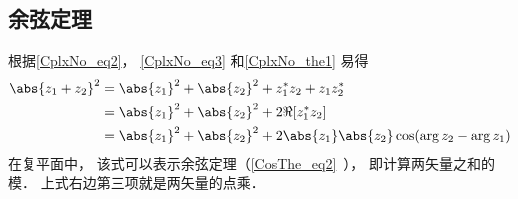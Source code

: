 \subsection{余弦定理}
根据\autoref{CplxNo_eq2}， \autoref{CplxNo_eq3} 和\autoref{CplxNo_the1} 易得
\begin{equation}
\begin{aligned}
\abs{z_1 + z_2}^2 &= \abs{z_1}^2 + \abs{z_2}^2 + z_1^* z_2 + z_1 z_2^*\\
&= \abs{z_1}^2 + \abs{z_2}^2 + 2\Re[z_1^* z_2]\\
&= \abs{z_1}^2 + \abs{z_2}^2 + 2\abs{z_1}\abs{z_2}\cos(\arg z_2 - \arg z_1)
\end{aligned}
\end{equation}
在复平面中， 该式可以表示余弦定理（\autoref{CosThe_eq2}~）， 即计算两矢量之和的模． 上式右边第三项就是两矢量的点乘．
